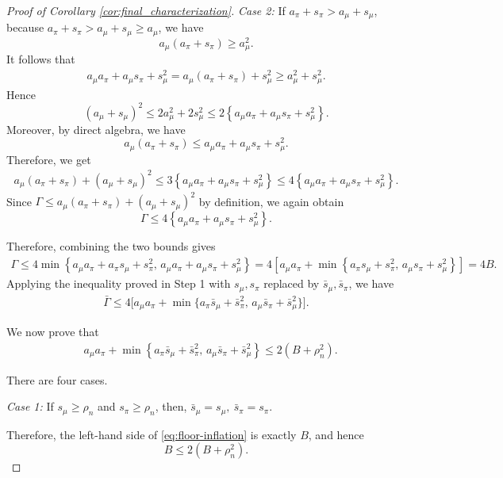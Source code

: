 \documentclass[11pt]{article}
\begin{document}
\begin{proof}[Proof of Corollary \ref{cor:final_characterization}]
\medskip

\noindent
\emph{Case 2:} If $a_\pi+s_\pi>a_\mu+s_\mu$, because $a_\pi+s_\pi>a_\mu+s_\mu\ge a_\mu$, we have
\[
a_\mu(a_\pi+s_\pi)\ge a_\mu^2.
\]
It follows that
\begin{align*}
a_\mu a_\pi+a_\mu s_\pi+s_\mu^2=a_\mu(a_\pi+s_\pi)+s_\mu^2\ge
a_\mu^2+s_\mu^2.
\end{align*}
Hence
\[
(a_\mu+s_\mu)^2
\le
2a_\mu^2+2s_\mu^2
\le
2\left\{
a_\mu a_\pi+a_\mu s_\pi+s_\mu^2
\right\}.
\]
Moreover, by direct algebra,  we have
\[
a_\mu(a_\pi+s_\pi)
\le
a_\mu a_\pi+a_\mu s_\pi+s_\mu^2.
\]
Therefore, we get
\begin{align*}
a_\mu(a_\pi+s_\pi)+(a_\mu+s_\mu)^2
\le
3\left\{
a_\mu a_\pi+a_\mu s_\pi+s_\mu^2
\right\}
\le
4\left\{
a_\mu a_\pi+a_\mu s_\pi+s_\mu^2
\right\}.
\end{align*}
Since $\Gamma
\le
a_\mu(a_\pi+s_\pi)+(a_\mu+s_\mu)^2$ by definition,
we again obtain
\[
\Gamma
\le
4\left\{
a_\mu a_\pi+a_\mu s_\pi+s_\mu^2
\right\}.
\]

Therefore, combining the two bounds gives
\begin{align*}
\Gamma
\le
4\min\left\{
a_\mu a_\pi+a_\pi s_\mu+s_\pi^2,\,
a_\mu a_\pi+a_\mu s_\pi+s_\mu^2
\right\}
=
4\left[
a_\mu a_\pi+
\min\left\{
a_\pi s_\mu+s_\pi^2,\,
a_\mu s_\pi+s_\mu^2
\right\}
\right]=
4B.
\end{align*}
Applying the inequality proved in Step 1 with
\(s_\mu,s_\pi\) replaced by \(\bar s_\mu,\bar s_\pi\), we have
\begin{align}
\bar\Gamma
\le
4\Big[
a_\mu a_\pi+
\min\big\{
a_\pi\bar s_\mu+\bar s_\pi^2,\,
a_\mu\bar s_\pi+\bar s_\mu^2
\big\}
\Big].
\label{eq:bargamma-first-bound}
\end{align}

We now prove that
\begin{align}
&a_\mu a_\pi+
\min\left\{
a_\pi\bar s_\mu+\bar s_\pi^2,\,
a_\mu\bar s_\pi+\bar s_\mu^2
\right\}
\le
2\left(B+\rho_n^2\right).
\label{eq:floor-inflation}
\end{align}

There are four cases.

\medskip

\noindent
\emph{Case 1:} If \(s_\mu\ge\rho_n\) and \(s_\pi\ge\rho_n\), then, $\bar s_\mu=s_\mu,
\ 
\bar s_\pi=s_\pi$.

Therefore, the left-hand side of
\eqref{eq:floor-inflation} is exactly \(B\), and hence
\[
B\le2(B+\rho_n^2).
\]

\medskip


\end{proof}
\end{document}
